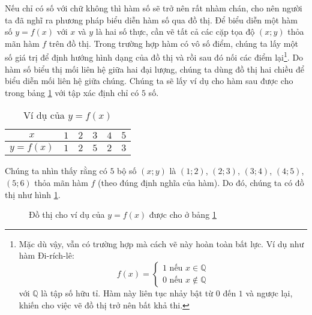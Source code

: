 Nếu chỉ có số với chữ không thì hàm số sẽ trở nên rất nhàm chán, cho nên người ta đã nghĩ ra phương pháp biểu diễn hàm số qua đồ thị. Để biểu diễn một hàm số $y=f(x)$ với $x$ và $y$ là hai số thực, cần vẽ tất cả các cặp tọa độ $(x; y)$ thỏa mãn hàm $f$ trên đồ thị. Trong trường hợp hàm có vô số điểm, chúng ta lấy một số giá trị để định hướng hình dạng của đồ thị và rồi sau đó nối các điểm lại\footnote{Mặc dù vậy, vẫn có trường hợp mà cách vẽ này hoàn toàn bất lực. Ví dụ như hàm Đi-rích-lê: $$f(x) =
\begin{cases}
   1 \text{ nếu } x\in \mathbb{Q} \\
   0 \text{ nếu } x\notin \mathbb{Q}
\end{cases}$$ với $\mathbb{Q}$ là tập số hữu tỉ. Hàm này liên tục nhảy bật từ $0$ đến $1$ và ngược lại, khiến cho việc vẽ đồ thị trở nên bất khả thi.}. Do hàm số biểu thị mối liên hệ giữa hai đại lượng, chúng ta dùng đồ thị hai chiều để biểu diễn mối liên hệ giữa chúng. Chúng ta sẽ lấy ví dụ cho hàm sau được cho trong bảng \ref{tab:ham_so_mot_bien:dinh_nghia:vddths} với tập xác định chỉ có $5$ số.

\begin{table}[H]
   \centering
   \begin{tabular}{|c|c|c|c|c|c|}
      \hline
      $x$ & $1$ & $2$ & $3$ & $4$ & $5$ \\
      \hline
      $y=f(x)$ & $1$ & $2$ & $5$ & $2$ & $3$ \\
      \hline
   \end{tabular}
   \caption{Ví dụ của $y = f(x)$}
   \label{tab:ham_so_mot_bien:dinh_nghia:vddths}
\end{table}

\noindent Chúng ta nhìn thấy rằng có $5$ bộ số $(x;y)$ là $(1;2)$, $(2;3)$, $(3;4)$, $(4;5)$, $(5;6)$ thỏa mãn hàm $f$ (theo đúng định nghĩa của hàm). Do đó, chúng ta có đồ thị như hình \ref{fig:ham_so_mot_bien:dinh_nghia:vddths}. 

\begin{figure}[H]
   \centering
   \caption{Đồ thị cho ví dụ của $y = f(x)$ được cho ở bảng \ref{tab:ham_so_mot_bien:dinh_nghia:vddths}}
   \label{fig:ham_so_mot_bien:dinh_nghia:vddths}
\end{figure}

